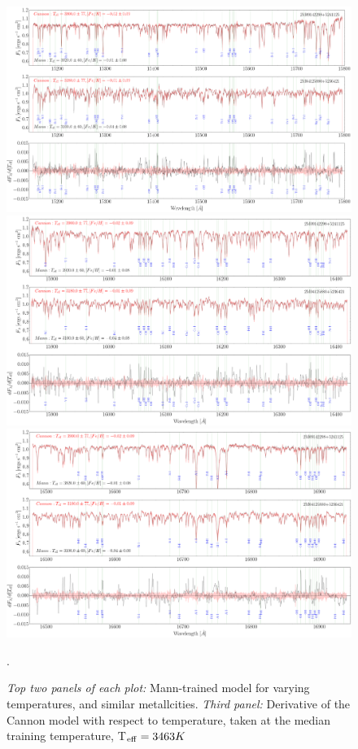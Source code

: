 \documentclass[modern]{aastex62}
\begin{document}
\begin{figure}[ht]
\begin{center}
\includegraphics[width=16cm]{figures/demo_derivatives_teff1.png}
\includegraphics[width=16cm]{figures/demo_derivatives_teff2.png}
\includegraphics[width=16cm]{figures/demo_derivatives_teff3.png}
\end{center}
\caption{\textit{Top two panels of each plot:} Mann-trained model for varying temperatures, and similar metallcities. \textit{Third panel:} Derivative of the Cannon model with respect to temperature, taken at the median training temperature, T$_{\rm eff}=3463 K$}. \label{fig:demo_teff}
\end{figure}
\end{document}
